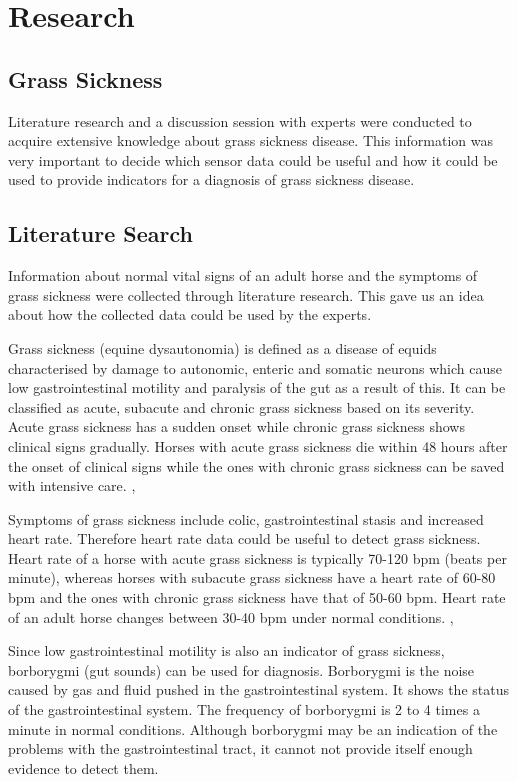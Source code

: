 \chapter{Research}


\section{Grass Sickness}
Literature research and a discussion session with experts were conducted to acquire extensive knowledge about grass sickness disease. This information was very important to decide which sensor data could be useful and how it could be used to provide indicators for a diagnosis of grass sickness disease. 


\section{Literature Search}
Information about normal vital signs of an adult horse and the symptoms of grass sickness were collected through literature research. This gave us an idea about how the collected data could be used by the experts. 

Grass sickness (equine dysautonomia) is defined as a disease of equids characterised by damage to autonomic, enteric and somatic neurons which cause low gastrointestinal motility and paralysis of the gut as a result of this. It can be classified as acute, subacute and chronic grass sickness based on its severity. Acute grass sickness has a sudden onset while chronic grass sickness shows clinical signs gradually. Horses with acute grass sickness die within 48 hours after the onset of clinical signs while the ones with chronic grass sickness can be saved with intensive care. \cite{robinson2009current}, \cite{edwards2010edaphic} \cite{web}

Symptoms of grass sickness include colic, gastrointestinal stasis and increased heart rate. Therefore heart rate data could be useful to detect grass sickness. Heart rate of a horse with acute grass sickness is typically 70-120 bpm (beats per minute), whereas horses with subacute grass sickness have a heart rate of 60-80 bpm and the ones with chronic grass sickness have that of 50-60 bpm. Heart rate of an adult horse changes between 30-40 bpm under normal conditions. \cite{corley2009equine}, \cite{robinson2009current}

Since low gastrointestinal motility is also an indicator of grass sickness, borborygmi (gut sounds) can be used for diagnosis. Borborygmi is the noise caused by gas and fluid pushed in the gastrointestinal system. It shows the status of the gastrointestinal system. The frequency of borborygmi is 2 to 4 times a minute in normal conditions. Although borborygmi may be an indication of the problems with the gastrointestinal tract, it cannot not provide itself enough evidence to detect them. \cite{corley2009equine}


